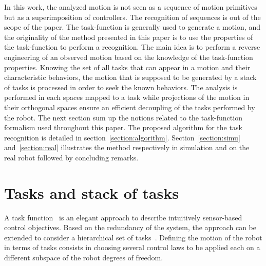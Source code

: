 \documentclass[letterpaper, 10pt, conference]{ieeeconf}      %
\begin{document}
In this work, the analyzed motion is not seen as a sequence of motion primitives but as a
superimposition of controllers. The recognition of sequences
is out of the scope of the paper.
The task-function is generally used to generate a motion\cite{siciliano91, mansard07}, and
the originality of the method presented in this paper is to use the properties of the
task-function to perform a recognition. The main idea is
to perform a reverse engineering of an observed motion based on the knowledge
of the task-function properties. Knowing the set of all tasks that can appear 
in a motion and their characteristic behaviors, 
the motion that is supposed to be generated by a stack of tasks is processed in order to
seek the known behaviors. The analysis is performed in each spaces mapped to a task while projections
of the motion in their orthogonal spaces ensure an efficient decoupling of the tasks performed
by the robot.
The next section sum up the notions related to the task-function
formalism used throughout this paper. The proposed algorithm for the task recognition
is detailed in section~\ref{section:algorithm}. Section~\ref{section:simu} and~\ref{section:real}
illustrates the method respectively in simulation and on the real robot followed
by concluding remarks.

\section{Tasks and stack of tasks}
A task function~\cite{samson91} is an elegant approach to describe intuitively
sensor-based control objectives. Based on the redundancy of the system, the
approach can be extended to consider a hierarchical set of
tasks~\cite{siciliano91}.  Defining the motion of the robot in terms of tasks
consists in choosing several control laws to be applied each on a different
subspace of the robot degrees of freedom. 
\end{document}
